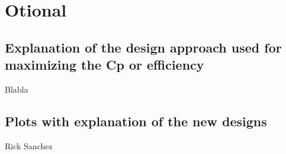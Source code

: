 \chapter{Otional}

\section{Explanation of the design approach used for maximizing the Cp or efficiency}

Blabla

\section{Plots with explanation of the new designs}

Rick Sanchez